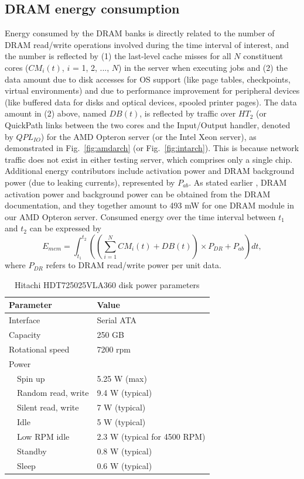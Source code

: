 \documentclass[acmtaco]{acmtrans2m}
\newcommand{\figurename}{Fig.}
\begin{document}
\subsection{DRAM energy consumption}
\label{sec:dram}
Energy consumed by the DRAM banks is directly related to the number of
DRAM read/write operations involved during the time interval of
interest, and the number is reflected by (1) the last-level cache misses
for all $N$ constituent cores ($CM_{i}(t)$, $i$ = 1, 2, ..., $N$) in
the server when executing jobs and (2) the data amount due to disk
accesses for OS support (like page tables, checkpoints, virtual
environments) and due to performance improvement for peripheral devices
(like buffered data for disks and optical devices, spooled printer
pages).  The data amount in (2) above, named $DB(t)$, is reflected by
traffic over $HT_{2}$ (or QuickPath links between the two cores and the
Input/Output handler, denoted by $QPL_{IO}$) for the AMD Opteron server
(or the Intel Xeon server), as demonstrated in
\figurename~\ref{fig:amdarch} (or \figurename~\ref{fig:intarch}).
This is because network traffic does not exist in either testing server,
which comprises only a single chip.  Additional energy contributors
include activation power and DRAM background power (due to leaking
currents), represented by $P_{ab}$.  As stated earlier
\cite{Micron2007}, DRAM activation power and background power can be
obtained from the DRAM documentation, and they together amount to 493 mW
for one DRAM module in our AMD Opteron server.  Consumed energy over the
time interval between $t_{1}$ and $t_{2}$ can be expressed by
\begin{equation*}
  \label{eq:dram}
  E_{mem}=\displaystyle\int_{t_{1}}^{t_{2}}\left( (\sum_{i=1}^{N}CM_{i}(t)+DB(t))\times
    P_{DR}+P_{ab}\right)dt,
\end{equation*} 
where $P_{DR}$ refers to DRAM read/write power per unit data.
\begin{table}[tp]
\caption{Hitachi HDT725025VLA360 disk power parameters}
\centering
\begin{tabular}{ l l }
\hline
\textbf{Parameter} & \textbf{Value} \\
\hline
  Interface & Serial ATA\\
  Capacity & 250 GB\\
  Rotational speed & 7200 rpm  \\
  Power & \\
  ~~Spin up& 5.25 W (max)\\
  ~~Random read, write & 9.4 W (typical)\\
  ~~Silent read, write & 7 W (typical)\\
  ~~Idle & 5 W (typical)  \\
  ~~Low RPM idle & 2.3 W (typical for 4500 RPM)\\
  ~~Standby & 0.8 W (typical)\\
  ~~Sleep & 0.6 W (typical)\\
\hline
\end{tabular}
\label{tab:hddparam}
\end{table}
\end{document}
